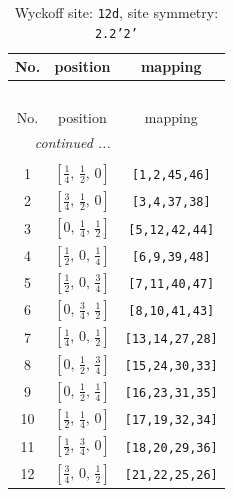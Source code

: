 \documentclass[fleqn,8pt]{jsarticle}
\begin{document}
\begin{longtable}{ccc}
\caption{Wyckoff site: {\tt 12d}, site symmetry: {\tt 2.2'2'}}
 \\
 \hline \hline
No. & position & mapping \\ \hline \endfirsthead

\multicolumn{2}{l}{\tablename\ \thetable{}} \\
 \hline \hline
No. & position & mapping \\ \hline \endhead

 \hline \hline
\multicolumn{2}{r}{\footnotesize\it continued ...} \\ \endfoot

 \hline \hline
\multicolumn{2}{r}{} \\ \endlastfoot

1 & $\left[ \frac{1}{4},\, \frac{1}{2},\, 0 \right]$ & {\tt [1,2,45,46]} \\ \hline
2 & $\left[ \frac{3}{4},\, \frac{1}{2},\, 0 \right]$ & {\tt [3,4,37,38]} \\ \hline
3 & $\left[ 0,\, \frac{1}{4},\, \frac{1}{2} \right]$ & {\tt [5,12,42,44]} \\ \hline
4 & $\left[ \frac{1}{2},\, 0,\, \frac{1}{4} \right]$ & {\tt [6,9,39,48]} \\ \hline
5 & $\left[ \frac{1}{2},\, 0,\, \frac{3}{4} \right]$ & {\tt [7,11,40,47]} \\ \hline
6 & $\left[ 0,\, \frac{3}{4},\, \frac{1}{2} \right]$ & {\tt [8,10,41,43]} \\ \hline
7 & $\left[ \frac{1}{4},\, 0,\, \frac{1}{2} \right]$ & {\tt [13,14,27,28]} \\ \hline
8 & $\left[ 0,\, \frac{1}{2},\, \frac{3}{4} \right]$ & {\tt [15,24,30,33]} \\ \hline
9 & $\left[ 0,\, \frac{1}{2},\, \frac{1}{4} \right]$ & {\tt [16,23,31,35]} \\ \hline
10 & $\left[ \frac{1}{2},\, \frac{1}{4},\, 0 \right]$ & {\tt [17,19,32,34]} \\ \hline
11 & $\left[ \frac{1}{2},\, \frac{3}{4},\, 0 \right]$ & {\tt [18,20,29,36]} \\ \hline
12 & $\left[ \frac{3}{4},\, 0,\, \frac{1}{2} \right]$ & {\tt [21,22,25,26]} \\
\end{longtable}
\renewcommand{\arraystretch}{1.2}
\end{document}
